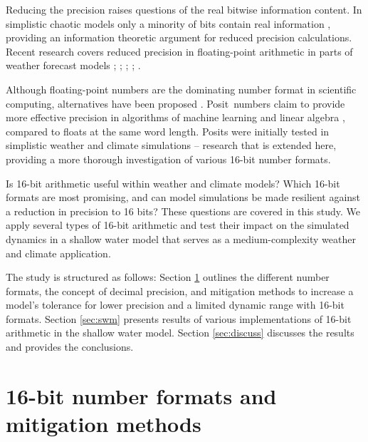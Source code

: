 \documentclass[draft]{agujournal2019}
\begin{document}
Reducing the precision raises questions of the real bitwise information content.
In simplistic chaotic models only a minority of bits contain real information
\cite{Jeffress2017}, providing an information theoretic argument for reduced
precision calculations. Recent research covers reduced precision in
floating-point arithmetic in parts of weather forecast models \cite{Duben2014,Thornes2017,Chantry2019,Hatfield2020};
 \cite{Saffin2020};
 \cite{TintoPrims2019};  \cite{Dawson2018};
 \cite{Hatfield2017,Hatfield2018}.  

Although floating-point numbers are the dominating number format in scientific
computing, alternatives have been proposed \cite{Gustafson2017a,Johnson2020}.
Posit\texttrademark ~numbers claim to provide more effective precision in algorithms
of machine learning and linear algebra \cite{Gustafson2017,Langroudi2019}, compared
to floats at the same word length. Posits were initially tested in simplistic
weather and climate simulations \cite{Klower2019a} -- research that is extended
here, providing a more thorough investigation of various 16-bit number formats.

Is 16-bit arithmetic useful within weather and climate models? Which 16-bit
formats are most promising, and can model simulations be made resilient
against a reduction in precision to 16 bits? These questions are covered in
this study. We apply several types of 16-bit arithmetic and test their impact
on the simulated dynamics in a shallow water model that serves as a medium-complexity
weather and climate application.

The study is structured as follows: Section \ref{sec:formats} outlines the
different number formats, the concept of decimal precision, and mitigation
methods to increase a model's tolerance for lower precision and a limited dynamic
range with 16-bit formats. Section \ref{sec:swm} presents results
of various implementations of 16-bit arithmetic in the shallow water model.
Section \ref{sec:discuss} discusses the results and provides the conclusions.

\section{16-bit number formats and mitigation methods}
\label{sec:formats}
\end{document}

